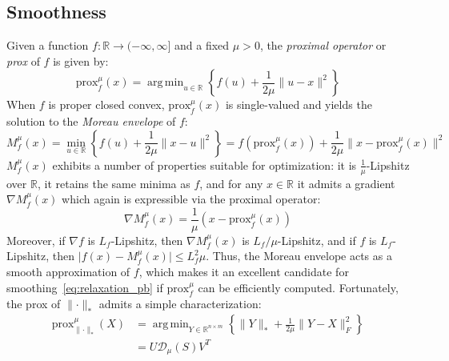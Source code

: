 \documentclass[10pt]{article}
\DeclareMathOperator*{\argmin}{arg\,min}
\begin{document}
\subsection*{Smoothness}
Given a function $f: \mathbb{R} \to (-\infty, \infty]$ and a fixed $\mu > 0$, the \emph{proximal operator} or \emph{prox} of $f$ is given by:
\begin{equation}
	\mathrm{prox}_f^\mu(x) = \argmin_{u \in \mathbb{R}} \left\{ f(u) + \frac{1}{2\mu} \lVert u - x \rVert^2 \right\}
\end{equation}
When $f$ is proper closed convex, $\mathrm{prox}_f^\mu(x)$ is single-valued and yields the solution to the \emph{Moreau envelope} of $f$:
\begin{equation*}
	M_f^\mu(x) = \min\limits_{u \in \mathbb{R}} \left\{ f(u) + \frac{1}{2 \mu} \lVert x - u \rVert^2 \right\} = f(\mathrm{prox}_f^\mu(x)) + \frac{1}{2 \mu} \lVert x -\mathrm{prox}_f^\mu(x) \rVert^2
\end{equation*}
$M_f^\mu(x)$ exhibits a number of properties suitable for optimization: it is $\frac{1}{\mu}$-Lipshitz over $\mathbb{R}$, it retains the same minima as $f$, and for any $x \in \mathbb{R}$ it admits a gradient $\nabla M_f^\mu(x)$ which again is expressible via the proximal operator:
\begin{equation}
	\nabla M_f^\mu(x) = \frac{1}{\mu}(x - \mathrm{prox}_f^\mu(x))
\end{equation}
Moreover, if $\nabla f$ is $L_f$-Lipshitz, then $\nabla M_f^\mu(x)$ is $L_f/\mu$-Lipshitz, and if $f$ is $L_f$-Lipshitz, then $\lvert f(x) - M_f^\mu(x) \rvert \leq L_f^2 \mu$. 
Thus, the Moreau envelope acts as a smooth approximation of $f$, which makes it an excellent candidate for smoothing~\eqref{eq:relaxation_pb} if $\mathrm{prox}_f^\mu$ can be efficiently computed. Fortunately, the prox of $\lVert \cdot \rVert_\ast$ admits a simple characterization: 
\begin{align}	\label{eq:prox_nuclear}
	\mathrm{prox}_{\lVert \cdot \rVert_\ast}^\mu(X) &= \argmin_{Y \in \mathbb{R}^{n \times m}} \left\{ \lVert Y \rVert_\ast + \frac{1}{2\mu}\lVert Y - X \rVert_F^2 \right\} \\
	&= U \mathcal{D}_\mu(S) V^T
\end{align}
\end{document}
